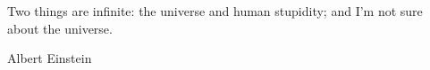\newpage
\null\vfill
\begin{flushright}
\begin{minipage}{9.0cm}

Two things are infinite: the universe and human stupidity; and I'm not sure about the universe. 

\end{minipage}
\end{flushright}


\begin{flushright}
Albert Einstein
\end{flushright}

\newpage %

\null
